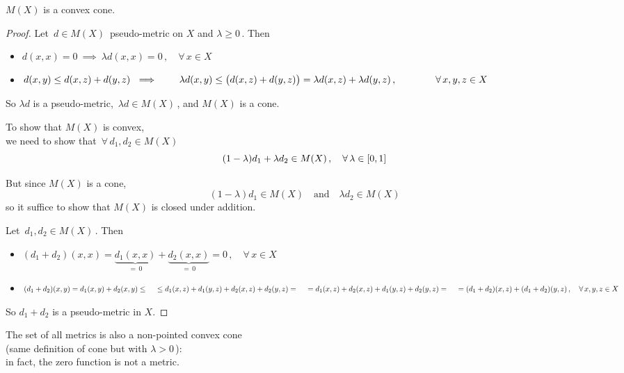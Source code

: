 \documentclass[./main.tex]{subfiles}
\begin{document}
\begin{proposition}
    $M(X)$ is a convex cone.
\end{proposition}
\begin{proof}
    Let $\, d \in M(X) \,$ pseudo-metric on $X$ and $\lambda \geq 0 \,$. Then
    \begin{itemize}
        \item $d(x,x) = 0 \ \implies\ \lambda d(x,x) = 0 \,, \quad \forall\, x \in X$
        \item \onehalfspacing
          $ d(x,y) \leq d(x,z) + d(y,z) \ \implies\ \\
            \Bsp{\qquad} \lambda d(x,y) \leq \bigl( d(x,z) + d(y,z) \bigr) = \lambda d(x,z) + \lambda d(y,z) \,, \\
            \Bsp{\qquad\qquad} \forall\, x,y,z \in X $
    \end{itemize}
    So $\lambda d$ is a pseudo-metric, $\, \lambda d \in M(X) \,$, and $M(X)$ is a cone.\bigskip
    
    To show that $M(X)$ is convex, \\[2pt]
    \bsp we need to show that $\, \forall\, d_1, d_2 \in M(X) \,$
    \[ (1-\lambda) d_1 + \lambda d_2 \in M(X) \,, \quad \forall\, \lambda \in [0,1] \nospblw \]
    
    But since $M(X)$ is a cone,
    \[ (1-\lambda) d_1 \in M(X) \quad \text{and} \quad \lambda d_2 \in M(X) \]
    so it suffice to show that $M(X)$ is closed under addition.

    Let $\, d_1, d_2 \in M(X) \,$. Then
    \begin{itemize}
        \item $(d_1 + d_2)(x,x) = \underbrace{d_1(x,x)}_{=\,0} + \underbrace{d_2(x,x)}_{=\,0} = 0 \,, \quad \forall\, x \in X$
        \item \onehalfspacing
          $ (d_1 + d_2)(x,y) = d_1(x,y) + d_2(x,y) \leq \\
            \mbox{}\quad \leq d_1(x,z) + d_1(y,z) + d_2(x,z) + d_2(y,z) = \\
            \mbox{}\quad = d_1(x,z) + d_2(x,z) + d_1(y,z) + d_2(y,z) = \\
            \mbox{}\quad = (d_1 + d_2)(x,z) + (d_1 + d_2)(y,z) \,, \quad \forall\, x,y,z \in X $
    \end{itemize}
    So $d_1 + d_2$ is a pseudo-metric in $X$.
\end{proof}

\clearpage

\begin{remark}
    The set of all metrics is also a non-pointed convex cone \\
    \bsp (same definition of cone but with $\lambda > 0 \,$): \\
    in fact, the zero function is not a metric.
\end{remark}\bigskip\medskip
\end{document}
